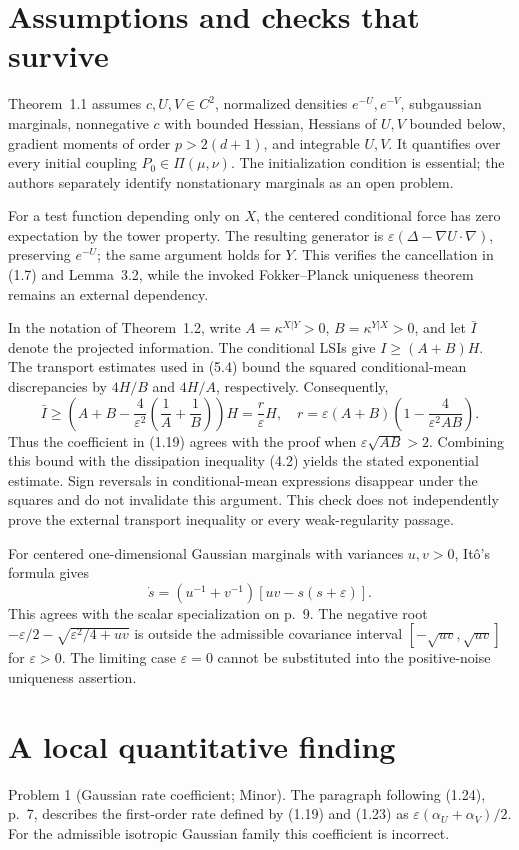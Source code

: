 \documentclass[10pt]{article}
\begin{document}
\section*{Assumptions and checks that survive}
Theorem 1.1 assumes \(c,U,V\in C^2\), normalized densities \(e^{-U},e^{-V}\), subgaussian marginals, nonnegative \(c\) with bounded Hessian, Hessians of \(U,V\) bounded below, gradient moments of order \(p>2(d+1)\), and integrable \(U,V\). It quantifies over every initial coupling \(P_0\in\Pi(\mu,\nu)\). The initialization condition is essential; the authors separately identify nonstationary marginals as an open problem.\par
For a test function depending only on \(X\), the centered conditional force has zero expectation by the tower property. The resulting generator is \(\varepsilon(\Delta-\nabla U\cdot\nabla)\), preserving \(e^{-U}\); the same argument holds for \(Y\). This verifies the cancellation in (1.7) and Lemma 3.2, while the invoked Fokker–Planck uniqueness theorem remains an external dependency.\par
In the notation of Theorem 1.2, write \(A=\kappa^{X|Y}>0\), \(B=\kappa^{Y|X}>0\), and let \(\bar I\) denote the projected information. The conditional LSIs give \(I\ge(A+B)H\). The transport estimates used in (5.4) bound the squared conditional-mean discrepancies by \(4H/B\) and \(4H/A\), respectively. Consequently, \[\bar I\ge
\left(A+B-\frac4{\varepsilon^2}\left(\frac1A+\frac1B\right)\right)H
=\frac r\varepsilon H,
\quad
r=\varepsilon(A+B)\left(1-\frac4{\varepsilon^2AB}\right).\] Thus the coefficient in (1.19) agrees with the proof when \(\varepsilon\sqrt{AB}>2\). Combining this bound with the dissipation inequality (4.2) yields the stated exponential estimate. Sign reversals in conditional-mean expressions disappear under the squares and do not invalidate this argument. This check does not independently prove the external transport inequality or every weak-regularity passage.\par
For centered one-dimensional Gaussian marginals with variances \(u,v>0\), Itô’s formula gives \[\dot s=(u^{-1}+v^{-1})[uv-s(s+\varepsilon)].\] This agrees with the scalar specialization on p. 9. The negative root \(-\varepsilon/2-\sqrt{\varepsilon^2/4+uv}\) is outside the admissible covariance interval \([-\sqrt{uv},\sqrt{uv}]\) for \(\varepsilon>0\). The limiting case \(\varepsilon=0\) cannot be substituted into the positive-noise uniqueness assertion.\par
\section*{A local quantitative finding}
Problem 1 (Gaussian rate coefficient; Minor).  The paragraph following (1.24), p. 7, describes the first-order rate defined by (1.19) and (1.23) as \(\varepsilon(\alpha_U+\alpha_V)/2\). For the admissible isotropic Gaussian family this coefficient is incorrect.\par
\end{document}
